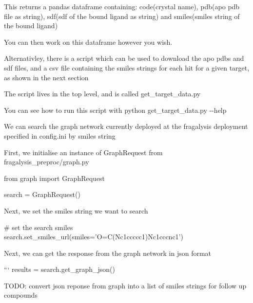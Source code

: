 This returns a pandas dataframe containing\+: code(crystal name), pdb(apo pdb file as string), sdf(sdf of the bound ligand as string) and smiles(smiles string of the bound ligand)

You can then work on this dataframe however you wish.

Alternativley, there is a script which can be used to download the apo pdb\textquotesingle{}s and sdf files, and a csv file containing the smiles strings for each hit for a given target, as shown in the next section

The script lives in the top level, and is called get\+\_\+target\+\_\+data.\+py

You can see how to run this script with {\ttfamily python get\+\_\+target\+\_\+data.\+py -\/-\/help}

We can search the graph network currently deployed at the fragalysis deployment specified in config.\+ini by smiles string

First, we initialise an instance of Graph\+Request from fragalysis\+\_\+preproc/graph.\+py


\begin{DoxyCode}
from graph import GraphRequest

search = GraphRequest()
\end{DoxyCode}


Next, we set the smiles string we want to search


\begin{DoxyCode}
# set the search smiles
search.set\_smiles\_url(smiles='O=C(Nc1ccccc1)Nc1cccnc1')
\end{DoxyCode}


Next, we can get the response from the graph network in json format

``` results = search.\+get\+\_\+graph\+\_\+json()

T\+O\+DO\+: convert json reponse from graph into a list of smiles strings for follow up compounds 